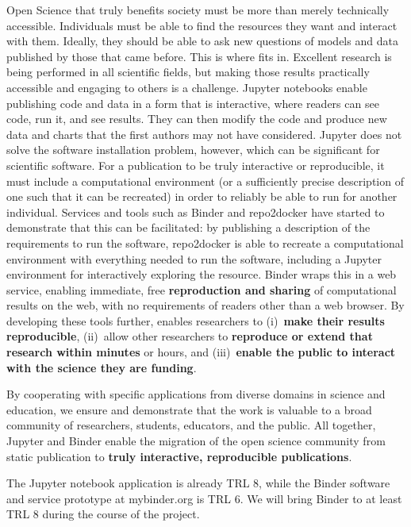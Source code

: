 Open Science that truly benefits society must be more than merely
technically accessible.  Individuals must be able to find the
resources they want and interact with them.  Ideally, they should be
able to ask new questions of models and data published by those that
came before.  This is where \TheProject fits in.  Excellent research
is being performed in all scientific fields, but making those results
practically accessible and engaging to others is a challenge.
Jupyter notebooks enable publishing code and data in a form that is
interactive, where readers can see code, run it, and see results.
They can then modify the code and produce new data and charts that the
first authors may not have considered.  Jupyter does not solve the
software installation problem, however, which can be significant for
scientific software.  For a publication to be truly interactive or
reproducible, it must include a computational environment (or a
sufficiently precise description of one such that it can be recreated)
in order to reliably be able to run for another individual.  Services
and tools such as Binder and repo2docker have started to demonstrate
that this can be facilitated: by
publishing a description of the requirements to run the software,
repo2docker is able to recreate a computational environment with
everything needed to run the software, including a Jupyter
environment for interactively exploring the resource.  Binder wraps
this in a web service, enabling immediate, free \textbf{reproduction and sharing} of
computational results on the web, with no requirements of readers
other than a web browser.
By developing these tools further, \TheProject enables researchers to
(i)~\textbf{make their results reproducible},
(ii)~allow other researchers to \textbf{reproduce or extend that research within minutes} or hours,
and (iii)~\textbf{enable the public to interact with the
science they are funding}.

By cooperating with specific applications from diverse domains in science and education,
we ensure and demonstrate that the work is valuable to a broad community of researchers, students, educators, and the public.
All together, Jupyter and Binder enable the migration of the open
science community from static publication to \textbf{truly interactive,
reproducible publications}.

The Jupyter notebook application is already TRL 8,
while the Binder software and service prototype at mybinder.org is TRL 6.
We will bring Binder to at least TRL 8 during the course of the project.



